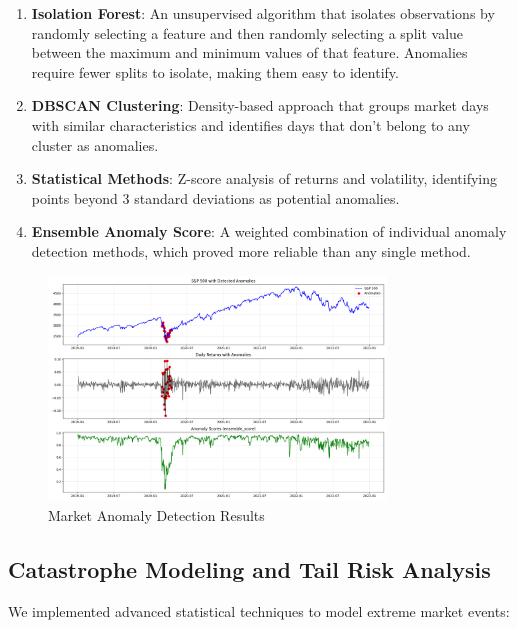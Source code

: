 \documentclass[10pt]{article}
\begin{document}
\begin{enumerate}
    \item \textbf{Isolation Forest}: An unsupervised algorithm that isolates observations by randomly selecting a feature and then randomly selecting a split value between the maximum and minimum values of that feature. Anomalies require fewer splits to isolate, making them easy to identify.
    
    \item \textbf{DBSCAN Clustering}: Density-based approach that groups market days with similar characteristics and identifies days that don't belong to any cluster as anomalies.
    
    \item \textbf{Statistical Methods}: Z-score analysis of returns and volatility, identifying points beyond 3 standard deviations as potential anomalies.
    
    \item \textbf{Ensemble Anomaly Score}: A weighted combination of individual anomaly detection methods, which proved more reliable than any single method.
\end{enumerate}

\begin{figure}[htbp]
    \centering
    \includegraphics[width=0.8\textwidth]{../results/anomalies/anomalies_visualization.png}
    \caption{Market Anomaly Detection Results}
    \label{fig:anomalies}
\end{figure}

\subsection{Catastrophe Modeling and Tail Risk Analysis}
We implemented advanced statistical techniques to model extreme market events:
\end{document}
